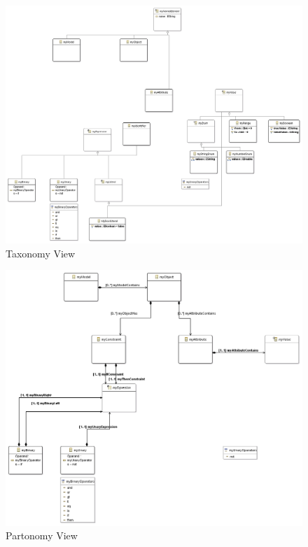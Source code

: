 \documentclass[paper=a4, fontsize=11pt]{scrartcl} %
\numberwithin{equation}{section} %
\numberwithin{figure}{section} %
\numberwithin{table}{section} %
\begin{document}
\begin{figure}[H]
\centering
\includegraphics[scale=0.65]{pictures/taxView.png}
\caption{Taxonomy View}
\end{figure}

\begin{figure}[H]
\centering
\includegraphics[scale=0.73]{pictures/partView.png}
\caption{Partonomy View}
\end{figure}


\end{document}
